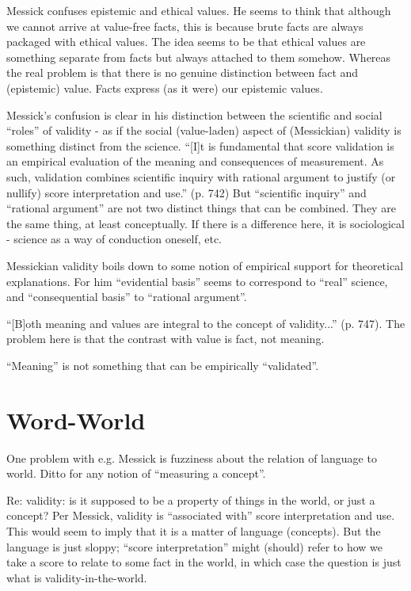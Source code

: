 \documentclass[11pt,twoside]{article}
\begin{document}
Messick confuses epistemic and ethical values.  He seems to think that
although we cannot arrive at value-free facts, this is because brute
facts are always packaged with ethical values.  The idea seems to be
that ethical values are something separate from facts but always
attached to them somehow.  Whereas the real problem is that there is
no genuine distinction between fact and (epistemic) value.  Facts
express (as it were) our epistemic values.

Messick's confusion is clear in his distinction between the scientific
and social ``roles'' of validity - as if the social (value-laden)
aspect of (Messickian) validity is something distinct from the
science.  ``[I]t is fundamental that score validation is an empirical
evaluation of the meaning and consequences of measurement.  As such,
validation combines scientific inquiry with rational argument to
justify (or nullify) score interpretation and use.'' (p. 742) But
``scientific inquiry'' and ``rational argument'' are not two distinct
things that can be combined.  They are the same thing, at least
conceptually.  If there is a difference here, it is sociological -
science as a way of conduction oneself, etc.

Messickian validity boils down to some notion of empirical support for
theoretical explanations.  For him ``evidential basis'' seems to
correspond to ``real'' science, and ``consequential basis'' to
``rational argument''.

``[B]oth meaning and values are integral to the concept of
validity...'' (p. 747).  The problem here is that the contrast with
value is fact, not meaning.

``Meaning'' is not something that can be empirically ``validated''.

\section{Word-World}

One problem with e.g. Messick is fuzziness about the relation of
language to world.  Ditto for any notion of ``measuring a concept''.

Re: validity: is it supposed to be a property of things in the world,
or just a concept?  Per Messick, validity is ``associated with'' score
interpretation and use.  This would seem to imply that it is a matter
of language (concepts).  But the language is just sloppy; ``score
interpretation'' might (should) refer to how we take a score to relate
to some fact in the world, in which case the question is just what is
validity-in-the-world.
\end{document}
